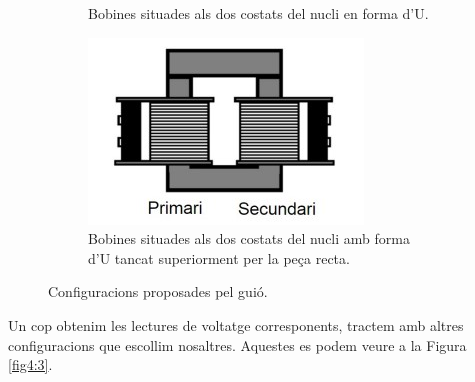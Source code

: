 \documentclass[a4paper,10.5pt]{report}
\begin{document}
\begin{figure}[h]
\begin{subfigure}[b]{0.3\textwidth}
		\caption{Bobines situades als dos costats del nucli en forma d'U.}
		\label{fig4:2b}
	\end{subfigure}
	\hspace{0.5cm}
	\begin{subfigure}[b]{0.3\textwidth}
		\centering
		\includegraphics[width=\textwidth]{42c.jpg}
		\caption{Bobines situades als dos costats del nucli amb forma d'U tancat superiorment per la peça recta.}
		\label{fig4:2c}
	\end{subfigure}
	\caption{Configuracions proposades pel guió.}
	\label{fig4:2}
\end{figure}

Un cop obtenim les lectures de voltatge corresponents, tractem amb altres configuracions que escollim nosaltres. Aquestes es podem veure a la Figura \ref{fig4:3}.
\end{document}
